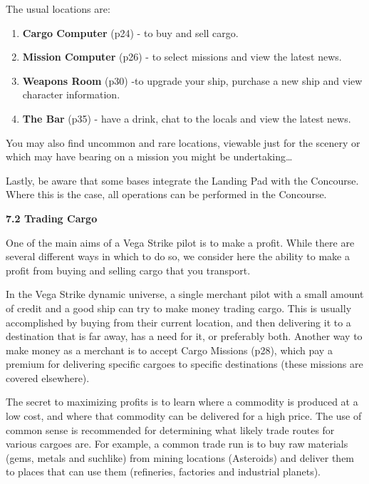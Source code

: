 \documentclass{article}
\begin{document}
The usual locations are: 

\begin{enumerate}
\item  \textbf{Cargo Computer }(p24) - to buy and sell cargo. 

\item  \textbf{Mission Computer }(p26) - to select missions and view the latest news. 

\item  \textbf{Weapons Room} (p30) -to upgrade your ship, purchase a new ship and view character information. 

\item  \textbf{The Bar} (p35) - have a drink, chat to the locals and view the latest news. 
\end{enumerate}



You may also find uncommon and rare locations, viewable just for the scenery or which may have bearing on a mission you might be undertaking\dots  

Lastly, be aware that some bases integrate the Landing Pad with the Concourse. Where this is the case, all operations can be performed in the Concourse. 



\textbf{7.2 Trading Cargo }

One of the main aims of a Vega Strike pilot is to make a profit. While there are several different ways in which to do so, we consider here the ability to make a profit from buying and selling cargo that you transport. 

In the Vega Strike dynamic universe, a single merchant pilot with a small amount of credit and a good ship can try to make money trading cargo. This is usually accomplished by buying from their current location, and then delivering it to a destination that is far away, has a need for it, or preferably both. Another way to make money as a merchant is to accept Cargo Missions (p28), which pay a premium for delivering specific cargoes to specific destinations (these missions are covered elsewhere). 

The secret to maximizing profits is to learn where a commodity is produced at a low cost, and where that commodity can be delivered for a high price. The use of common sense is recommended for determining what likely trade routes for various cargoes are. For example, a common trade run is to buy raw materials (gems, metals and suchlike) from mining locations (Asteroids) and deliver them to places that can use them (refineries, factories and industrial planets). 
\end{document}
